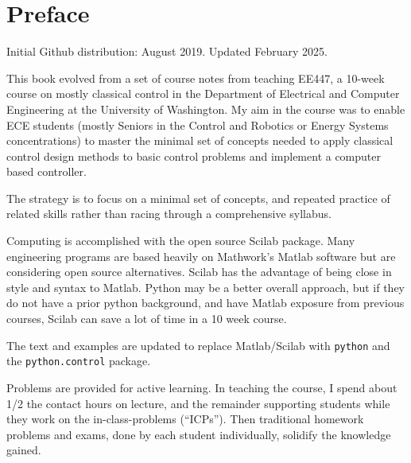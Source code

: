 \chapter*{Preface}

Initial Github distribution: August 2019. Updated February 2025.
\vspace{0.25in}

This book evolved from a set of course notes from teaching EE447,
a 10-week course on mostly classical control in the Department of Electrical and Computer Engineering at the University of Washington. My aim in the course was to enable ECE students (mostly Seniors in the Control and Robotics or Energy Systems concentrations) to  master the minimal set of concepts needed to apply  classical control design methods to basic control problems and implement a computer based controller.

The strategy is to focus on a minimal set of concepts, and repeated practice of related skills rather than racing through a comprehensive syllabus.

Computing is accomplished with the open source Scilab package.  Many engineering programs are based heavily
on Mathwork's  Matlab software but are considering open source alternatives.  Scilab has the advantage of being close in style and syntax to Matlab.
Python may be a better overall approach, but if they do not have a prior python background,
and have Matlab exposure from previous courses, Scilab can save a lot of time in a 10 week course.


The text and examples are updated to replace Matlab/Scilab with {\tt python} and the {\tt  python.control} package.


Problems are provided for active learning.  In teaching the course, I spend about 1/2 the contact
hours on lecture, and the remainder supporting students while they work on the in-class-problems (``ICPs'').   Then traditional
homework problems and exams, done by each student individually,
solidify the knowledge gained.

